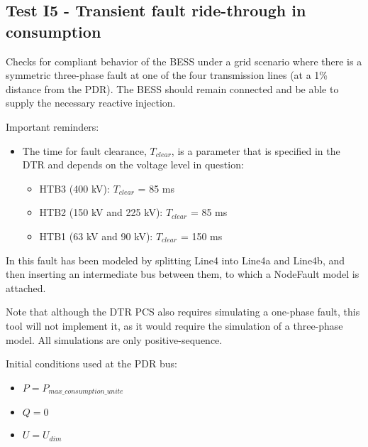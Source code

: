    \renewcommand{\DTRPcs}{ThreePhaseFault} %
    \renewcommand{\OCname}{TransientBoltedConsumption}


    \subsection{Test I5 - Transient fault ride-through in consumption}

    Checks for compliant behavior of the BESS under a grid scenario where there
    is a symmetric three-phase fault at one of the four transmission lines
    (at a 1\% distance from the PDR). The BESS should remain connected and
    be able to supply the necessary reactive injection.

    \GridCircuitZthree

    \noindent Important reminders:
    \begin{itemize}
        \item The time for fault clearance, $T_{clear}$, is a parameter that
        is specified in the DTR and depends on the voltage level in
        question:
        \begin{itemize}
            \item HTB3 (400 kV): $T_{clear}$ = 85 ms
            \item HTB2 (150 kV and 225 kV): $T_{clear}$ = 85 ms
            \item HTB1 (63 kV and 90 kV): $T_{clear}$ = 150 ms
        \end{itemize}
    \end{itemize}

    In \Dynawo this fault has been modeled by splitting Line4 into Line4a
    and Line4b, and then inserting an intermediate bus between them, to
    which a NodeFault model is attached.

    Note that although the DTR PCS also requires simulating a one-phase
    fault, this tool will not implement it, as it would require the
    simulation of a three-phase model. All simulations are only
    positive-sequence.

    \begin{description}
        \item Initial conditions used at the PDR bus:
        \begin{itemize}
            \item $P = P_{max\_consumption\_unite}$
            \item $Q = 0$
            \item $U = U_{dim}$
        \end{itemize}
    \end{description}

